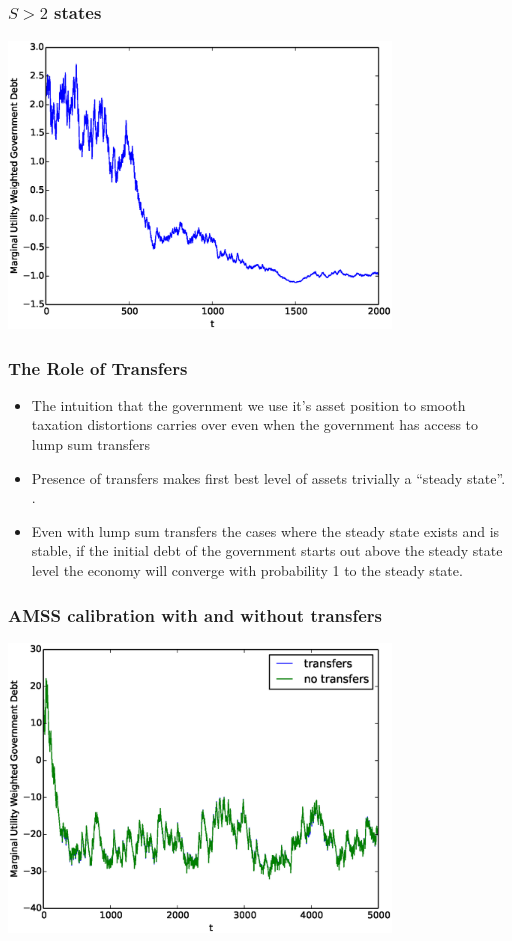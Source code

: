 \documentclass{beamer}
\begin{document}
\subsection{}

\begin{frame}
	\frametitle{$S>2$ states}
	\begin{center}
	\includegraphics[width=4in]{Images/5stateiid.eps}
	\end{center}
\end{frame}



 \begin{frame}
  \frametitle{The Role of Transfers}
	\begin{itemize}
	\item  The intuition that the government we use it's asset position to smooth taxation distortions carries over even when the government has access to lump sum transfers
	\item Presence of transfers makes first best level of assets trivially a ``steady state''.    .	
\item  Even with lump sum transfers the cases where the steady state exists and is stable, if the initial debt of the government starts out above the steady state level the economy will converge with probability 1 to the steady state.
		
	\end{itemize}
 \end{frame}

 \begin{frame}
	\frametitle{AMSS calibration with and without transfers}
	\begin{center}
	\includegraphics[width=4in]{Images/transfer_example1.eps}
	\end{center}
\end{frame}
\end{document}

